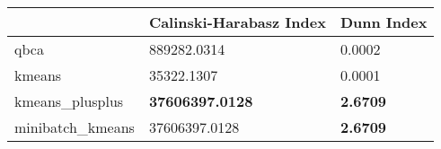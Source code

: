 \begin{table}[htbp]
\centering
\begin{tabular}{lll}
\toprule
 & Calinski-Harabasz Index & Dunn Index \\
\midrule
qbca & 889282.0314 & 0.0002 \\
kmeans & 35322.1307 & 0.0001 \\
kmeans_plusplus & \textbf{37606397.0128} & \textbf{2.6709} \\
minibatch_kmeans & 37606397.0128 & \textbf{2.6709} \\
\bottomrule
\end{tabular}
\end{table}

